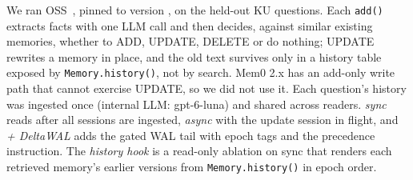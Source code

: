 We ran \memzero{} OSS~\citep{chhikara2025mem0}, pinned to version , on the  held-out KU questions. Each \texttt{add()} extracts facts with one LLM call and then decides, against similar existing memories, whether to ADD, UPDATE, DELETE or do nothing; UPDATE rewrites a memory in place, and the old text survives only in a history table exposed by \texttt{Memory.history()}, not by search. Mem0 2.x has an add-only write path that cannot exercise UPDATE, so we did not use it. Each question's history was ingested once (internal LLM: gpt-6-luna) and shared across readers. \emph{\memzero{} sync} reads after all sessions are ingested, \emph{\memzero{} async} with the update session in flight, and \emph{\memzero{} + DeltaWAL} adds the gated WAL tail with epoch tags and the precedence instruction. The \emph{history hook} is a read-only ablation on \memzero{} sync that renders each retrieved memory's earlier versions from \texttt{Memory.history()} in epoch order.

